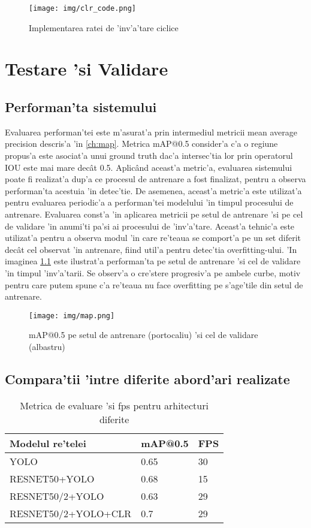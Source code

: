 \documentclass[12pt,a4paper,twoside]{report}
\begin{document}
\begin{figure}[H]
  \centering
  \texttt{[image: img/clr\_code.png]}
  \caption{Implementarea ratei de 'inv'a'tare ciclice}
  \label{fig:implementare}
\end{figure}

\chapter{Testare 'si Validare}
\section{Performan'ta sistemului}
Evaluarea performan'tei este m'asurat'a prin intermediul metricii mean average precision descris'a 'in \ref{ch:map}. Metrica mAP@0.5 consider'a c'a o regiune propus'a este asociat'a unui ground truth dac'a intersec'tia lor prin operatorul IOU este mai mare dec\^at 0.5. Aplic\^and aceast'a metric'a, evaluarea sistemului poate fi realizat'a dup'a ce procesul de antrenare a fost finalizat, pentru a observa performan'ta acestuia 'in detec'tie. De asemenea, aceast'a metric'a este utilizat'a pentru evaluarea periodic'a a performan'tei modelului 'in timpul procesului de antrenare. Evaluarea const'a 'in aplicarea metricii pe setul de antrenare 'si pe cel de validare 'in anumi'ti pa'si ai procesului de 'inv'a'tare. Aceast'a tehnic'a este utilizat'a pentru a observa modul 'in care re'teaua se comport'a pe un set diferit dec\^at cel observat 'in antrenare, fiind util'a pentru detec'tia overfitting-ului. 'In imaginea \ref{fig:map_retea} este ilustrat'a performan'ta pe setul de antrenare 'si cel de validare 'in timpul 'inv'a'tarii. Se observ'a o cre'stere progresiv'a pe ambele curbe, motiv pentru care putem spune c'a re'teaua nu face overfitting pe s'age'tile din setul de antrenare.

\begin{figure}[H]
\center
\texttt{[image: img/map.png]}
\caption{mAP@0.5 pe setul de antrenare (portocaliu) 'si cel de validare (albastru)}
\label{fig:map_retea}
\end{figure}

\section{Compara'tii 'intre diferite abord'ari realizate}
\begin{table}[ht]
\centering   
\begin{tabular}{|p{6cm}||p{3cm}|p{3cm}|}
 \hline
 Modelul re'telei & mAP@0.5 & FPS\\
 \hline
 YOLO & 0.65 & 30\\
 RESNET50+YOLO & 0.68 & 15\\
 RESNET50/2+YOLO & 0.63 & 29\\
 RESNET50/2+YOLO+CLR & 0.7 & 29\\
 \hline
\end{tabular}
\caption{Metrica de evaluare 'si fps pentru arhitecturi diferite}
\label{table:nonlin} 
\end{table}
\end{document}
